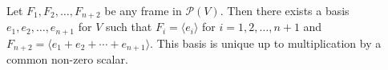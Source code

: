 Let $F_1, F_2, \dots, F_{n+2}$ be any frame in $\mathcal{P}(V)$. Then there exists a basis $e_1, e_2, \dots, e_{n+1}$ for $V$ such that $F_i = \langle e_i \rangle$ for $i = 1, 2, \dots, n+1$ and $F_{n+2} = \langle e_1 + e_2 + \cdots + e_{n+1} \rangle$. This basis is unique up to multiplication by a common non-zero scalar.
